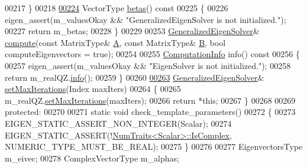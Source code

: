 \begin{DoxyCode}
{00217     \}
00218 
\hyperlink{group___eigenvalues___module_abeaa6f56cee367b83fd09d428462ca0c}{00224}     VectorType \hyperlink{group___eigenvalues___module_abeaa6f56cee367b83fd09d428462ca0c}{betas}()\textcolor{keyword}{ const}
00225 \textcolor{keyword}{    }\{
00226       eigen\_assert(m\_valuesOkay && \textcolor{stringliteral}{"GeneralizedEigenSolver is not initialized."});
00227       \textcolor{keywordflow}{return} m\_betas;
00228     \}
00229 
00253     \hyperlink{group___eigenvalues___module_class_eigen_1_1_generalized_eigen_solver}{GeneralizedEigenSolver}& \hyperlink{group___eigenvalues___module_a275910b47dfe5f40211dcb59cfd68f3c}{compute}(\textcolor{keyword}{const} MatrixType& 
      \hyperlink{group___core___module_class_eigen_1_1_matrix}{A}, \textcolor{keyword}{const} MatrixType& \hyperlink{group___core___module_class_eigen_1_1_matrix}{B}, \textcolor{keywordtype}{bool} computeEigenvectors = \textcolor{keyword}{true});
00254 
00255     \hyperlink{group__enums_ga85fad7b87587764e5cf6b513a9e0ee5e}{ComputationInfo} info()\textcolor{keyword}{ const}
00256 \textcolor{keyword}{    }\{
00257       eigen\_assert(m\_valuesOkay && \textcolor{stringliteral}{"EigenSolver is not initialized."});
00258       \textcolor{keywordflow}{return} m\_realQZ.\hyperlink{group___eigenvalues___module_a36bd77afed89f3f5c110a715e69e4c64}{info}();
00259     \}
00260 
\hyperlink{group___eigenvalues___module_a2a6f96bd042068cfc0eafba839b424bd}{00263}     \hyperlink{group___eigenvalues___module_class_eigen_1_1_generalized_eigen_solver}{GeneralizedEigenSolver}& \hyperlink{group___eigenvalues___module_a2a6f96bd042068cfc0eafba839b424bd}{setMaxIterations}(Index maxIters)
00264     \{
00265       m\_realQZ.\hyperlink{group___eigenvalues___module_a30ae65666b1757e4a2b6a28eaec12226}{setMaxIterations}(maxIters);
00266       \textcolor{keywordflow}{return} *\textcolor{keyword}{this};
00267     \}
00268 
00269   \textcolor{keyword}{protected}:
00270     
00271     \textcolor{keyword}{static} \textcolor{keywordtype}{void} check\_template\_parameters()
00272     \{
00273       EIGEN\_STATIC\_ASSERT\_NON\_INTEGER(Scalar);
00274       EIGEN\_STATIC\_ASSERT(!\hyperlink{group___core___module_struct_eigen_1_1_num_traits}{NumTraits<Scalar>::IsComplex}, 
      NUMERIC\_TYPE\_MUST\_BE\_REAL);
00275     \}
00276     
00277     EigenvectorsType m\_eivec;
00278     ComplexVectorType m\_alphas;
}
\end{DoxyCode}
